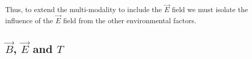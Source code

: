 Thus, to extend the multi-modality to include the $\vec{E}$ field we must isolate the influence of the $\vec{E}$ field from the other environmental factors.



\subsection{$\vec{B}$, $\vec{E}$ and $T$}


%
